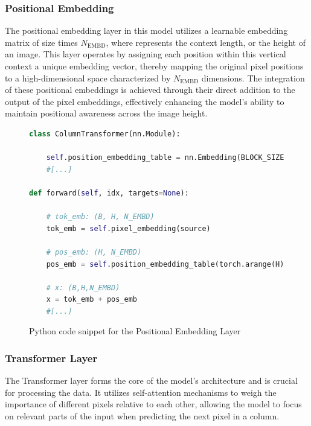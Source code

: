     \subsubsection{Positional Embedding}
    \label{sec:CIT_PositionalEmbedding}

    The positional embedding layer in this model utilizes a learnable embedding matrix of size  times \(N_{\text{EMBD}}\), where  represents the context length, or the height of an image. This layer operates by assigning each position within this vertical context a unique embedding vector, thereby mapping the original pixel positions to a high-dimensional space characterized by \(N_{\text{EMBD}}\) dimensions. The integration of these positional embeddings is achieved through their direct addition to the output of the pixel embeddings, effectively enhancing the model's ability to maintain positional awareness across the image height.


\begin{figure}[H]
    \centering
    \begin{lstlisting}[language=Python]
class ColumnTransformer(nn.Module):

    self.position_embedding_table = nn.Embedding(BLOCK_SIZE, N_EMBD)
    #[...]

def forward(self, idx, targets=None):

    # tok_emb: (B, H, N_EMBD)
    tok_emb = self.pixel_embedding(source) 

    # pos_emb: (H, N_EMBD)
    pos_emb = self.position_embedding_table(torch.arange(H)) 

    # x: (B,H,N_EMBD)
    x = tok_emb + pos_emb 
    #[...]
\end{lstlisting}
\caption{Python code snippet for the Positional Embedding Layer}
\label{fig:posEmbend_CIT}
\end{figure}
   
    \subsubsection{Transformer Layer}
    \label{sec:transformer_CIT}

    The Transformer layer forms the core of the model's architecture and is crucial for processing the data. It utilizes self-attention mechanisms \autocite{vaswani2023attention} to weigh the importance of different pixels relative to each other, allowing the model to focus on relevant parts of the input when predicting the next pixel in a column. 

